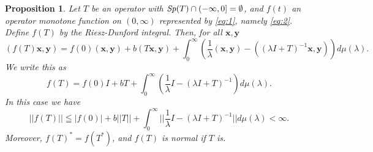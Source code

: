 \documentclass[10pt,a4paper]{amsart}
\newtheorem{proposition}[theorem]{Proposition}
\begin{document}
\begin{proposition}\label{Prop:2-2}
Let $T$ be an operator with ${\it Sp}(T) \cap (-\infty, 0] = \emptyset$, and $f(t)$ an
 operator monotone function on $(0, \infty)$ represented by \eqref{eq:1}, namely 
\eqref{eq:2}. 
Define $f(T)$ by the Riesz-Dunford integral.   
Then, for all $\mathbf{x}, \mathbf{y}$
$$
 (f(T) \mathbf{x}, \mathbf{y})=  f(0) (\mathbf{x}, \mathbf{y})  + b (T \mathbf{x}, \mathbf{y})
 + \int_0^{\infty} \left(\frac{1}{\lambda}(\mathbf{x}, \mathbf{y}) - 
((\lambda I  + T)^{-1}\mathbf{x}, \mathbf{y})\right)  d\mu(\lambda).$$
 We write this as
\begin{equation}
 f(T)=  f(0) I  + b T + \int_0^{\infty} \left(\frac{1}{\lambda } I - (\lambda I  + T)^{-1}\right) d\mu(\lambda).\label{eq:3}
\end{equation}
In this case we have
$$|| f(T)|| \leqq   |f(0)|  + b ||T|| + \int_0^{\infty} ||\frac{1}{\lambda } I - (\lambda I  + T)^{-1}|| d\mu(\lambda)
<\infty.$$
Moreover,  $f(T)^* = f(T^*)$,  and  $f(T)$ is normal if $T$ is.

\end{proposition}
 
\end{document}
